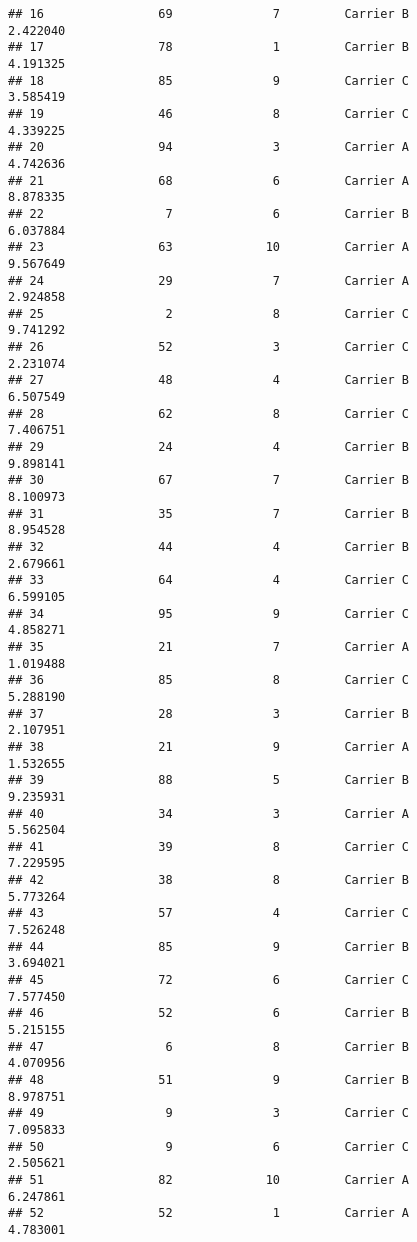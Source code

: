 \documentclass[
]{article}
\begin{document}
\begin{verbatim}
## 16                69              7         Carrier B       2.422040
## 17                78              1         Carrier B       4.191325
## 18                85              9         Carrier C       3.585419
## 19                46              8         Carrier C       4.339225
## 20                94              3         Carrier A       4.742636
## 21                68              6         Carrier A       8.878335
## 22                 7              6         Carrier B       6.037884
## 23                63             10         Carrier A       9.567649
## 24                29              7         Carrier A       2.924858
## 25                 2              8         Carrier C       9.741292
## 26                52              3         Carrier C       2.231074
## 27                48              4         Carrier B       6.507549
## 28                62              8         Carrier C       7.406751
## 29                24              4         Carrier B       9.898141
## 30                67              7         Carrier B       8.100973
## 31                35              7         Carrier B       8.954528
## 32                44              4         Carrier B       2.679661
## 33                64              4         Carrier C       6.599105
## 34                95              9         Carrier C       4.858271
## 35                21              7         Carrier A       1.019488
## 36                85              8         Carrier C       5.288190
## 37                28              3         Carrier B       2.107951
## 38                21              9         Carrier A       1.532655
## 39                88              5         Carrier B       9.235931
## 40                34              3         Carrier A       5.562504
## 41                39              8         Carrier C       7.229595
## 42                38              8         Carrier B       5.773264
## 43                57              4         Carrier C       7.526248
## 44                85              9         Carrier B       3.694021
## 45                72              6         Carrier C       7.577450
## 46                52              6         Carrier B       5.215155
## 47                 6              8         Carrier B       4.070956
## 48                51              9         Carrier B       8.978751
## 49                 9              3         Carrier C       7.095833
## 50                 9              6         Carrier C       2.505621
## 51                82             10         Carrier A       6.247861
## 52                52              1         Carrier A       4.783001

\end{verbatim}
\end{document}
